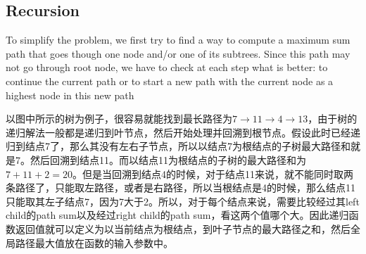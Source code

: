 
\subsection{Recursion}
To simplify the problem, we first try to find a way to compute a maximum sum path that goes though one node and/or one of its subtrees. Since this path may not go through root node, we have to check at each step what is better: to continue the current path or to start a new path with the current node as a highest node in this new path

以图中所示的树为例子，很容易就能找到最长路径为$7\to11\to4\to13$，由于树的递归解法一般都是递归到叶节点，然后开始处理并回溯到根节点。假设此时已经递归到结点7了，那么其没有左右子节点，所以以结点7为根结点的子树最大路径和就是7。然后回溯到结点11。而以结点11为根结点的子树的最大路径和为$7+11+2=20$。但是当回溯到结点4的时候，对于结点11来说，就不能同时取两条路径了，只能取左路径，或者是右路径，所以当根结点是4的时候，那么结点11只能取其左子结点7，因为7大于2。所以，对于每个结点来说，需要比较经过其left child的path sum以及经过right child的path sum，看这两个值哪个大。因此递归函数返回值就可以定义为以当前结点为根结点，到叶子节点的最大路径之和，然后全局路径最大值放在函数的输入参数中。


